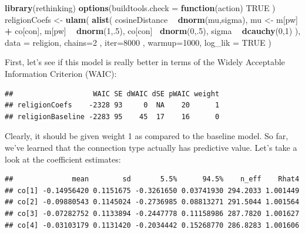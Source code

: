 \documentclass[12pt,]{book}
\newenvironment{Shaded}{\begin{snugshade}}{\end{snugshade}}
\newcommand{\KeywordTok}[1]{\textcolor[rgb]{0.13,0.29,0.53}{\textbf{#1}}}
\newcommand{\DataTypeTok}[1]{\textcolor[rgb]{0.13,0.29,0.53}{#1}}
\newcommand{\DecValTok}[1]{\textcolor[rgb]{0.00,0.00,0.81}{#1}}
\newcommand{\StringTok}[1]{\textcolor[rgb]{0.31,0.60,0.02}{#1}}
\newcommand{\OtherTok}[1]{\textcolor[rgb]{0.56,0.35,0.01}{#1}}
\newcommand{\ControlFlowTok}[1]{\textcolor[rgb]{0.13,0.29,0.53}{\textbf{#1}}}
\newcommand{\OperatorTok}[1]{\textcolor[rgb]{0.81,0.36,0.00}{\textbf{#1}}}
\newcommand{\NormalTok}[1]{#1}
\begin{document}
\begin{Shaded}
\begin{Highlighting}[]
\KeywordTok{library}\NormalTok{(rethinking)}
\KeywordTok{options}\NormalTok{(}\DataTypeTok{buildtools.check =} \ControlFlowTok{function}\NormalTok{(action) }\OtherTok{TRUE}\NormalTok{ )}
\NormalTok{religionCoefs <-}\StringTok{ }\KeywordTok{ulam}\NormalTok{(}
  \KeywordTok{alist}\NormalTok{(}
\NormalTok{    cosineDistance }\OperatorTok{~}\StringTok{ }\KeywordTok{dnorm}\NormalTok{(mu,sigma),}
\NormalTok{    mu <-}\StringTok{ }\NormalTok{m[pw] }\OperatorTok{+}\StringTok{ }\NormalTok{co[con],}
\NormalTok{    m[pw] }\OperatorTok{~}\StringTok{ }\KeywordTok{dnorm}\NormalTok{(}\DecValTok{1}\NormalTok{,.}\DecValTok{5}\NormalTok{),}
\NormalTok{    co[con] }\OperatorTok{~}\KeywordTok{dnorm}\NormalTok{(}\DecValTok{0}\NormalTok{,.}\DecValTok{5}\NormalTok{),}
\NormalTok{    sigma }\OperatorTok{~}\StringTok{ }\KeywordTok{dcauchy}\NormalTok{(}\DecValTok{0}\NormalTok{,}\DecValTok{1}\NormalTok{)}
\NormalTok{  ),}
  \DataTypeTok{data =}\NormalTok{ religion,}
  \DataTypeTok{chains=}\DecValTok{2}\NormalTok{ , }\DataTypeTok{iter=}\DecValTok{8000}\NormalTok{ , }\DataTypeTok{warmup=}\DecValTok{1000}\NormalTok{, }
  \DataTypeTok{log_lik =} \OtherTok{TRUE}
\NormalTok{)}
\end{Highlighting}
\end{Shaded}

\normalsize

\noindent First, let's see if this model is really better in terms of
the Widely Acceptable Information Criterion (WAIC):

\vspace{1mm} \footnotesize

\begin{verbatim}
##                   WAIC SE dWAIC dSE pWAIC weight
## religionCoefs    -2328 93     0  NA    20      1
## religionBaseline -2283 95    45  17    16      0
\end{verbatim}

\normalsize

Clearly, it should be given weight 1 as compared to the baseline model.
So far, we've learned that the connection type actually has predictive
value. Let's take a look at the coefficient estimates:

\vspace{1mm} \footnotesize

\begin{verbatim}
##              mean        sd       5.5%      94.5%    n_eff    Rhat4
## co[1] -0.14956420 0.1151675 -0.3261650 0.03741930 294.2033 1.001449
## co[2] -0.09880543 0.1145024 -0.2736985 0.08813271 291.5044 1.001564
## co[3] -0.07282752 0.1133894 -0.2447778 0.11158986 287.7820 1.001627
## co[4] -0.03103179 0.1131420 -0.2034442 0.15268770 286.8283 1.001606
\end{verbatim}
\end{document}
